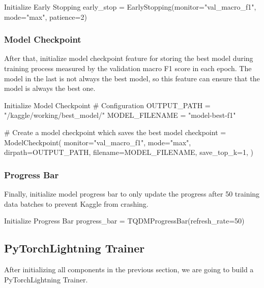 \documentclass[12pt, a4paper]{article}
\begin{document}
                    \begin{codeblock}{Initialize Early Stopping}
                        early_stop = EarlyStopping(monitor="val_macro_f1", mode="max", patience=2)
                    \end{codeblock}

	\pagebreak

                \subsubsection{Model Checkpoint}
                    After that, initialize model checkpoint feature for storing the best model during training process
                    measured by the validation macro F1 score in each epoch.
                    The model in the last is not always the best model, so this feature can ensure that the model
                    is always the best one.

                    \begin{codeblock}{Initialize Model Checkpoint}
                        # Configuration
                        OUTPUT_PATH = "/kaggle/working/best_model/"
                        MODEL_FILENAME = "model-best-f1"

                        # Create a model checkpoint which saves the best model
                        checkpoint = ModelCheckpoint(
                            monitor="val_macro_f1",
                            mode="max",
                            dirpath=OUTPUT_PATH,
                            filename=MODEL_FILENAME,
                            save_top_k=1,
                        )
                    \end{codeblock}

                \subsubsection{Progress Bar}
                    Finally, initialize model progress bar to only update the progress after 50 training data batches
                    to prevent Kaggle from crashing.

                    \begin{codeblock}{Initialize Progress Bar}
                        progress_bar = TQDMProgressBar(refresh_rate=50)
                    \end{codeblock}

            \subsection{PyTorchLightning Trainer}
                After initializing all components in the previous section, we are going to build a PyTorchLightning Trainer.
\end{document}
